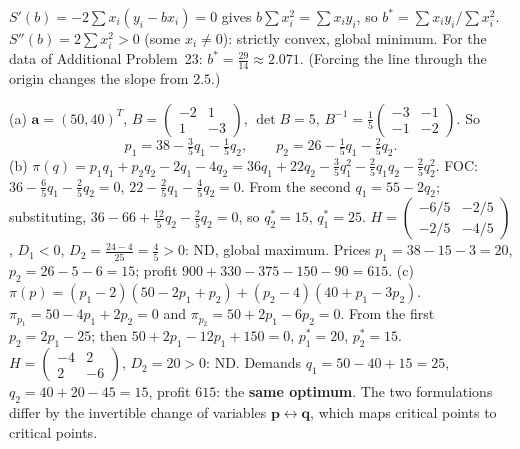 \begin{solutions}
    \item $S'(b) = -2 \sum x_i (y_i - b x_i) = 0$ gives $b \sum x_i^2 = \sum x_i y_i$, so $b^* = \sum x_i y_i / \sum x_i^2$. $S''(b) = 2 \sum x_i^2 > 0$ (some $x_i \ne 0$): strictly convex, global minimum. For the data of Additional Problem~23: $b^* = \tfrac{29}{14} \approx 2.071$. (Forcing the line through the origin changes the slope from $2.5$.)
    \item (a) $\mathbf{a} = (50, 40)^T$, $B = \begin{pmatrix} -2 & 1 \\ 1 & -3 \end{pmatrix}$, $\det B = 5$, $B^{-1} = \tfrac15 \begin{pmatrix} -3 & -1 \\ -1 & -2 \end{pmatrix}$. So
    \[p_1 = 38 - \tfrac35 q_1 - \tfrac15 q_2, \qquad p_2 = 26 - \tfrac15 q_1 - \tfrac25 q_2.\]
    (b) $\pi(q) = p_1 q_1 + p_2 q_2 - 2 q_1 - 4 q_2 = 36 q_1 + 22 q_2 - \tfrac35 q_1^2 - \tfrac25 q_1 q_2 - \tfrac25 q_2^2$. FOC: $36 - \tfrac65 q_1 - \tfrac25 q_2 = 0$, $22 - \tfrac25 q_1 - \tfrac45 q_2 = 0$. From the second $q_1 = 55 - 2 q_2$; substituting, $36 - 66 + \tfrac{12}{5} q_2 - \tfrac25 q_2 = 0$, so $q_2^* = 15$, $q_1^* = 25$. $H = \begin{pmatrix} -6/5 & -2/5 \\ -2/5 & -4/5 \end{pmatrix}$, $D_1 < 0$, $D_2 = \tfrac{24 - 4}{25} = \tfrac45 > 0$: ND, global maximum. Prices $p_1 = 38 - 15 - 3 = 20$, $p_2 = 26 - 5 - 6 = 15$; profit $900 + 330 - 375 - 150 - 90 = 615$. (c) $\pi(p) = (p_1 - 2)(50 - 2 p_1 + p_2) + (p_2 - 4)(40 + p_1 - 3 p_2)$. $\pi_{p_1} = 50 - 4 p_1 + 2 p_2 = 0$ and $\pi_{p_2} = 50 + 2 p_1 - 6 p_2 = 0$. From the first $p_2 = 2 p_1 - 25$; then $50 + 2 p_1 - 12 p_1 + 150 = 0$, $p_1^* = 20$, $p_2^* = 15$. $H = \begin{pmatrix} -4 & 2 \\ 2 & -6 \end{pmatrix}$, $D_2 = 20 > 0$: ND. Demands $q_1 = 50 - 40 + 15 = 25$, $q_2 = 40 + 20 - 45 = 15$, profit $615$: the \textbf{same optimum}. The two formulations differ by the invertible change of variables $\mathbf{p} \leftrightarrow \mathbf{q}$, which maps critical points to critical points.
\end{solutions}
